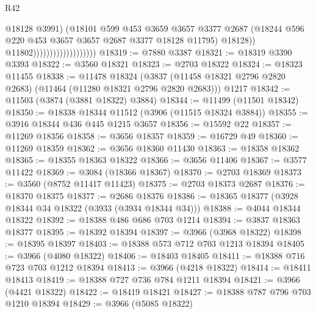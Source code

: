 \begin{lexlean}{R42}
\begin{coremodule}
                                              @18128
                                              @3991)
                                            (@18101
                                              @599
                                              @453
                                              @3659
                                              @3657
                                              @3377
                                              @2687
                                              (@18244
                                                @596
                                                @220
                                                @453
                                                @3657
                                                @3657
                                                @2687
                                                @3377
                                                @18128
                                                @11795)
                                              @18128))
                                          @11802)))))))))))))))))))
@18319 := @7880 @3387
@18321 := @18319 @3390 @3393
@18322 := @3560 @18321
@18323 := @2703 @18322
@18324 := @18323 @11455
@18338 := @11478
    @18324
    (@3837 (@11458 @18321 @2796 @2820 @2683) (@11464 (@11280 @18321 @2796 @2820 @2683)))
    @1217
@18342 := @11503 (@3874 (@3881 @18322) @3884)
@18344 := @11499 (@11501 @18342)
@18350 := @18338 @18344 @11512 (@3906 (@11515 @18324 @3884))
@18355 := @3916 @18344 @436 @445 @1215 @3657
@18356 := @15592 @22
@18357 := @11269 @18356
@18358 := @3656 @18357
@18359 := @16729 @49
@18360 := @11269 @18359
@18362 := @3656 @18360 @11430
@18363 := @18358 @18362
@18365 := @18355 @18363 @18322
@18366 := @3656 @11406
@18367 := @3577 @11422
@18369 := @3084 (@18366 @18367)
@18370 := @2703 @18369
@18373 := @3560 (@8752 @11417 @11423)
@18375 := @2703 @18373 @2687
@18376 := @18370 @18375
@18377 := @2686 @18376
@18386 := @18365 @18377 (@3928 @18344 @34 @18322 (@3933 (@3934 @18344 @34)))
@18388 := @4044 @18344 @18322
@18392 := @18388 @486 @686 @703 @1214
@18394 := @3837 @18363 @18377
@18395 := @18392 @18394
@18397 := @3966 (@3968 @18322)
@18398 := @18395 @18397
@18403 := @18388 @573 @712 @703 @1213 @18394
@18405 := @3966 (@4080 @18322)
@18406 := @18403 @18405
@18411 := @18388 @716 @723 @703 @1212 @18394
@18413 := @3966 (@4218 @18322)
@18414 := @18411 @18413
@18419 := @18388 @727 @736 @784 @1211 @18394
@18421 := @3966 (@4421 @18322)
@18422 := @18419 @18421
@18427 := @18388 @787 @796 @703 @1210 @18394
@18429 := @3966 (@5085 @18322)

\end{coremodule}
\end{lexlean}
